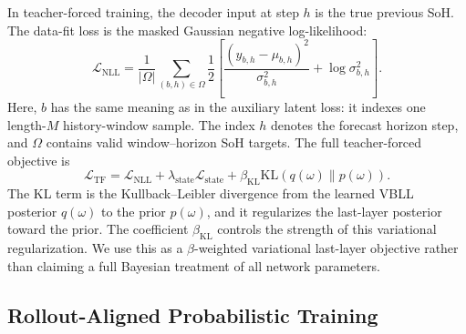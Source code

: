 \documentclass[conference]{IEEEtran}
\begin{document}
In teacher-forced training, the decoder input at step $h$ is the true previous
SoH. The data-fit loss is the masked Gaussian negative log-likelihood:
\begin{equation}
\mathcal{L}_{\mathrm{NLL}}
=
\frac{1}{|\Omega|}
\sum_{(b,h)\in\Omega}
\frac{1}{2}
\left[
\frac{(y_{b,h}-\mu_{b,h})^2}{\sigma_{b,h}^2}
+ \log \sigma_{b,h}^2
\right].
\end{equation}
Here, $b$ has the same meaning as in the auxiliary latent loss: it indexes one
length-$M$ history-window sample. The index $h$ denotes the forecast horizon
step, and $\Omega$ contains valid window--horizon SoH targets.
The full teacher-forced objective is
\begin{equation}
\mathcal{L}_{\mathrm{TF}}
=
\mathcal{L}_{\mathrm{NLL}}
+ \lambda_{\mathrm{state}}\mathcal{L}_{\mathrm{state}}
+ \beta_{\mathrm{KL}}\mathrm{KL}(q(\omega)\|p(\omega)).
\end{equation}
The KL term is the Kullback--Leibler divergence from the learned VBLL posterior
$q(\omega)$ to the prior $p(\omega)$, and it regularizes the last-layer posterior
toward the prior. The coefficient $\beta_{\mathrm{KL}}$ controls the strength of
this variational regularization.
We use this as a $\beta$-weighted variational last-layer objective rather than
claiming a full Bayesian treatment of all network parameters.

\subsection{Rollout-Aligned Probabilistic Training}
\end{document}
